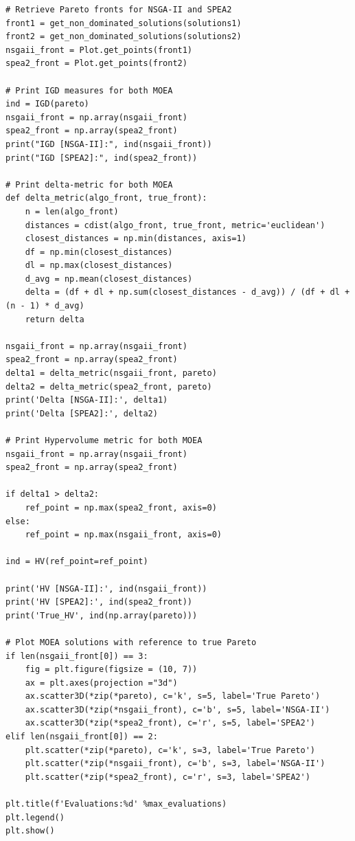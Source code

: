 \documentclass[sigconf, nonacm, preprint]{acmart}
\begin{document}
\begin{verbatim}
# Retrieve Pareto fronts for NSGA-II and SPEA2
front1 = get_non_dominated_solutions(solutions1)
front2 = get_non_dominated_solutions(solutions2)
nsgaii_front = Plot.get_points(front1)
spea2_front = Plot.get_points(front2)

# Print IGD measures for both MOEA
ind = IGD(pareto)
nsgaii_front = np.array(nsgaii_front)
spea2_front = np.array(spea2_front)
print("IGD [NSGA-II]:", ind(nsgaii_front))
print("IGD [SPEA2]:", ind(spea2_front))

# Print delta-metric for both MOEA
def delta_metric(algo_front, true_front):
    n = len(algo_front)
    distances = cdist(algo_front, true_front, metric='euclidean')
    closest_distances = np.min(distances, axis=1)
    df = np.min(closest_distances)
    dl = np.max(closest_distances)
    d_avg = np.mean(closest_distances)
    delta = (df + dl + np.sum(closest_distances - d_avg)) / (df + dl + (n - 1) * d_avg)
    return delta

nsgaii_front = np.array(nsgaii_front)
spea2_front = np.array(spea2_front)
delta1 = delta_metric(nsgaii_front, pareto)
delta2 = delta_metric(spea2_front, pareto)
print('Delta [NSGA-II]:', delta1)
print('Delta [SPEA2]:', delta2)

# Print Hypervolume metric for both MOEA
nsgaii_front = np.array(nsgaii_front)
spea2_front = np.array(spea2_front)

if delta1 > delta2:
    ref_point = np.max(spea2_front, axis=0)
else:
    ref_point = np.max(nsgaii_front, axis=0)

ind = HV(ref_point=ref_point)

print('HV [NSGA-II]:', ind(nsgaii_front))
print('HV [SPEA2]:', ind(spea2_front))
print('True_HV', ind(np.array(pareto)))

# Plot MOEA solutions with reference to true Pareto
if len(nsgaii_front[0]) == 3:
    fig = plt.figure(figsize = (10, 7))
    ax = plt.axes(projection ="3d")
    ax.scatter3D(*zip(*pareto), c='k', s=5, label='True Pareto')
    ax.scatter3D(*zip(*nsgaii_front), c='b', s=5, label='NSGA-II')
    ax.scatter3D(*zip(*spea2_front), c='r', s=5, label='SPEA2')
elif len(nsgaii_front[0]) == 2:
    plt.scatter(*zip(*pareto), c='k', s=3, label='True Pareto')
    plt.scatter(*zip(*nsgaii_front), c='b', s=3, label='NSGA-II')
    plt.scatter(*zip(*spea2_front), c='r', s=3, label='SPEA2')

plt.title(f'Evaluations:%d' %max_evaluations)
plt.legend()
plt.show()
\end{verbatim}
\end{document}

